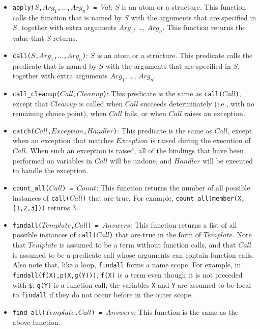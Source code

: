 \begin{itemize}
\item \texttt{apply($S$,$Arg_1$,$\ldots$,$Arg_n$) = $Val$}:   $S$ is an atom or a structure.  This function calls the function that is named by $S$ with the arguments that are specified in $S$, together with extra arguments $Arg_1$, \ldots, $Arg_n$.  This function returns the value that $S$ returns.
\item \texttt{call($S$,$Arg_1$,$\ldots$,$Arg_n$)}:  $S$ is an atom or a structure.  This predicate calls the predicate that is named by $S$ with the arguments that are specified in $S$, together with extra arguments $Arg_1$, \ldots, $Arg_n$.
\item \texttt{call\_cleanup($Call$,$Cleanup$)}: This predicate is the same as \texttt{call($Call$)}, except that \texttt{$Cleanup$} is called when \texttt{$Call$} succeeds determinately (i.e., with no remaining choice point), when \texttt{$Call$} fails, or when \texttt{$Call$} raises an exception.
\item \texttt{catch($Call$,$Exception$,$Handler$)}: This predicate is the same as $Call$, except when an exception that matches $Exception$ is raised during the execution of $Call$. When such an exception is raised, all of the bindings that have been performed on variables in \texttt{$Call$} will be undone, and \texttt{$Handler$} will be executed to handle the exception.
\item \texttt{count\_all($Call$) = $Count$}: This function returns the number of all possible instances of \texttt{call($Call$)} that are true. For example, \texttt{count\_all(member(X,[1,2,3]))} returns 3.
\item \texttt{findall($Template$,$Call$) = $Answers$}: This function returns a list of all possible instances of \texttt{call($Call$)} that are true in the form of $Template$. Note that $Template$ is assumed to be a term without function calls, and that $Call$ is assumed to be a predicate call whose arguments can contain function calls. Also note that, like a loop, \texttt{findall} forms a name scope. For example, in \texttt{findall(f(X),p(X,g(Y)))}, \texttt{f(X)} is a term even though it is not preceded with \verb+$+; \texttt{g(Y)} is a function call; the variables \texttt{X} and \texttt{Y} are assumed to be local to \texttt{findall} if they do not occur before in the outer scope.
\item \texttt{find\_all($Template$,$Call$) = $Answers$}: This function is the same as the above function.

\end{itemize}
